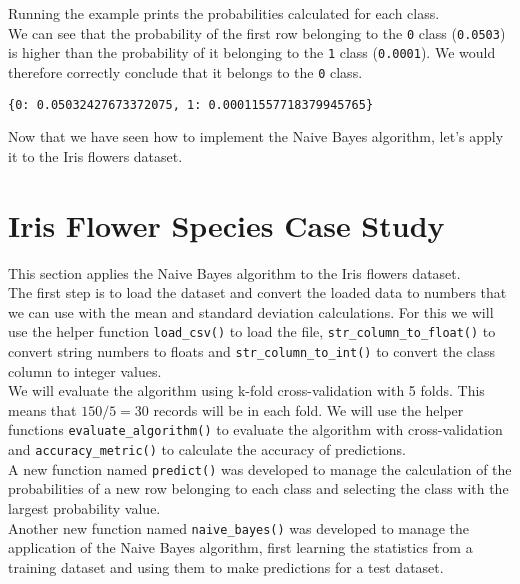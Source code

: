 \documentclass[12pt]{article}
\begin{document}
Running the example prints the probabilities calculated for each class.\\

We can see that the probability of the first row belonging to the \verb|0| class (\verb|0.0503|) is higher than the probability of it belonging to the \verb|1| class (\verb|0.0001|). We would therefore correctly conclude that it belongs to the \verb|0| class.

\begin{lstlisting}
{0: 0.05032427673372075, 1: 0.00011557718379945765}

\end{lstlisting}

Now that we have seen how to implement the Naive Bayes algorithm, let’s apply it to the Iris flowers dataset.

\section{Iris Flower Species Case Study}

This section applies the Naive Bayes algorithm to the Iris flowers dataset.\\

The first step is to load the dataset and convert the loaded data to numbers that we can use with the mean and standard deviation calculations. For this we will use the helper function \verb|load_csv()| to load the file, \verb|str_column_to_float()| to convert string numbers to floats and \verb|str_column_to_int()| to convert the class column to integer values.\\

We will evaluate the algorithm using k-fold cross-validation with 5 folds. This means that $ 150/5=30 $ records will be in each fold. We will use the helper functions \verb|evaluate_algorithm()| to evaluate the algorithm with cross-validation and \verb|accuracy_metric()| to calculate the accuracy of predictions.\\

A new function named \verb|predict()| was developed to manage the calculation of the probabilities of a new row belonging to each class and selecting the class with the largest probability value.\\

Another new function named \verb|naive_bayes()| was developed to manage the application of the Naive Bayes algorithm, first learning the statistics from a training dataset and using them to make predictions for a test dataset.\\
\end{document}
